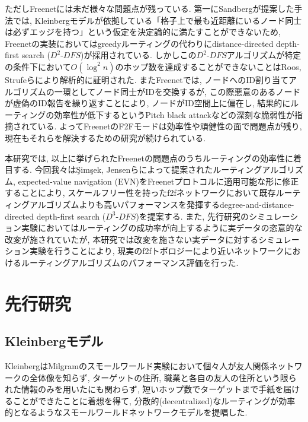 \documentclass[dvipdfmx]{ampbt}
\begin{document}
ただしFreenetには未だ様々な問題点が残っている. 第一にSandbergが提案した手法では, Kleinbergモデルが依拠している「格子上で最も近距離にいるノード同士は必ずエッジを持つ」という仮定を決定論的に満たすことができないため, Freenetの実装においてはgreedyルーティングの代わりにdistance-directed depth-first search ($D^2$-$DFS$)が採用されている. しかしこの$D^2$-$DFS$アルゴリズムが特定の条件下において$O(\log^2 n)$のホップ数を達成することができないことはRoos, Strufeらにより解析的に証明された\cite{roos2012provable, roos2013contribution, roos2016dealing}. またFreenetでは, ノードへのID割り当てアルゴリズムの一環としてノード同士がIDを交換するが, この際悪意のあるノードが虚偽のID報告を繰り返すことにより, ノードがID空間上に偏在し, 結果的にルーティングの効率性が低下するというPitch black attack\cite{evans2007routing}などの深刻な脆弱性が指摘されている. よってFreenetのF2Fモードは効率性や頑健性の面で問題点が残り, 現在もそれらを解決するための研究が続けられている.

本研究では, 以上に挙げられたFreenetの問題点のうちルーティングの効率性に着目する. 今回我々は{\c{S}}im{\c{s}}ek, Jensenらによって提案されたルーティングアルゴリズム, expected-value navigation (EVN)\cite{simsek2008navigating}をFreenetプロトコルに適用可能な形に修正することにより, スケールフリー性を持った\acrshort{f2f}ネットワークにおいて既存ルーティングアルゴリズムよりも高いパフォーマンスを発揮するdegree-and-distance-directed depth-first search ($D^3$-$DFS$)を提案する. また, 先行研究のシミュレーション実験においてはルーティングの成功率が向上するように実データの恣意的な改変が施されていたが, 本研究では改変を施さない実データに対するシミュレーション実験を行うことにより, 現実の\acrshort{f2f}トポロジーにより近いネットワークにおけるルーティングアルゴリズムのパフォーマンス評価を行った.

 \section{先行研究}
   \subsection{Kleinbergモデル} \label{sec:kleinberg}
   KleinbergはMilgramのスモールワールド実験\cite{milgram67smallworld}において個々人が友人関係ネットワークの全体像を知らず, ターゲットの住所, 職業と各自の友人の住所という限られた情報のみを用いたにも関わらず, 短いホップ数でターゲットまで手紙を届けることができたことに着想を得て, 分散的(decentralized)なルーティングが効率的となるようなスモールワールドネットワークモデルを提唱した\cite{kleinberg2000small}.
\end{document}
